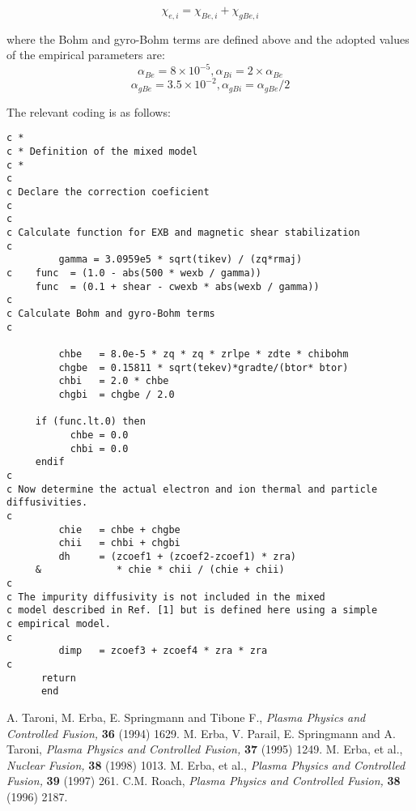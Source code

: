 \[ \chi_{e,i}=\chi_{Be,i}+\chi_{gBe,i}\]

where the Bohm and gyro-Bohm terms are defined above and the adopted values
of the empirical parameters are:\\

\[ \alpha_{Be} = 8\times10^{-5} ,\alpha_{Bi} = 2\times\alpha_{Be}\]
\[ \alpha_{gBe} = 3.5\times10^{-2} , \alpha_{gBi} = \alpha_{gBe}/2\]

The relevant coding is as follows:

\begin{verbatim}
c *
c * Definition of the mixed model
c *
c 
c Declare the correction coeficient
c
c
c Calculate function for EXB and magnetic shear stabilization
c
         gamma = 3.0959e5 * sqrt(tikev) / (zq*rmaj)
c	 func  = (1.0 - abs(500 * wexb / gamma))
	 func  = (0.1 + shear - cwexb * abs(wexb / gamma))
c
c Calculate Bohm and gyro-Bohm terms
c

         chbe   = 8.0e-5 * zq * zq * zrlpe * zdte * chibohm
         chgbe  = 0.15811 * sqrt(tekev)*gradte/(btor* btor) 
         chbi   = 2.0 * chbe
         chgbi  = chgbe / 2.0

	 if (func.lt.0) then
           chbe = 0.0
           chbi = 0.0
	 endif
c
c Now determine the actual electron and ion thermal and particle diffusivities.
c
         chie   = chbe + chgbe
         chii   = chbi + chgbi
         dh     = (zcoef1 + (zcoef2-zcoef1) * zra) 
     &             * chie * chii / (chie + chii)
c
c The impurity diffusivity is not included in the mixed
c model described in Ref. [1] but is defined here using a simple
c empirical model.
c
         dimp   = zcoef3 + zcoef4 * zra * zra
c
      return
      end
\end{verbatim}

\begin{thebibliography}{99}
A. Taroni, M. Erba, E. Springmann and Tibone F.,
{\em Plasma Physics and Controlled Fusion,} {\bf 36} (1994) 1629.
M. Erba, V. Parail, E. Springmann and A. Taroni,
{\em Plasma Physics and Controlled Fusion,} {\bf 37} (1995) 1249.
M. Erba, et al.,
{\em Nuclear Fusion,} {\bf 38} (1998) 1013.
M. Erba, et al.,
{\em Plasma Physics and Controlled Fusion,} {\bf 39} (1997) 261.
C.M. Roach, 
{\em Plasma Physics and Controlled Fusion,} {\bf 38} (1996) 2187.
\end{thebibliography}
